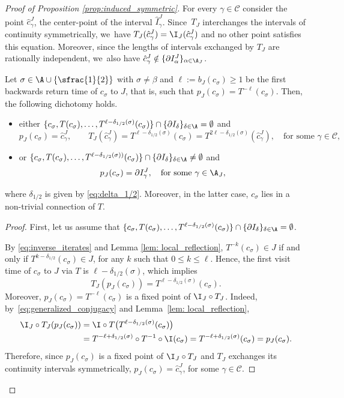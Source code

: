 \begin{proof}[Proof of Proposition \ref{prop:induced_symmetric}]
For every $\gamma\in\mathcal C$ consider the point $\hat c_\gamma^J$, the center-point of the interval $\hat I^J_{\gamma}$. Since~$T_J$ interchanges the intervals of continuity symmetrically, we~have $T_J(\hat c_\gamma^J)=\I_J(\hat c_\gamma^J)$ and no other point satisfies this equation. Moreover, since the lengths of intervals exchanged by $T_J$ are rationally independent, we~also have $\hat c_\gamma^J \notin\{\partial I^J_{\alpha}\}_{\alpha\in\A_J}$.

\begin{claim}
\label{cl:backward_centers}
Let $\sigma \in \A \cup \{\sfrac{1}{2}\}$ with $\sigma \neq \beta$ and $\ell := b_J(c_\sigma) \geq 1$ be the first backwards return time of $c_\sigma$ to $J$, that is, such that $p_J(c_\sigma) = T^{-\ell}(c_\sigma)$. Then, the following dichotomy holds.
\begin{itemize}
\item either $\{c_\sigma, T(c_\sigma), \ldots, T^{\ell - \delta_{1/2}(\sigma)}(c_\sigma)\} \cap \{\partial I_\delta\}_{\delta \in \A} = \emptyset$ and
\[
p_J(c_\sigma) = \hat c_\gamma^J,\qquad T_J(\hat c_\gamma^J) = T^{\ell - \delta_{1/2}(\sigma)}(c_\sigma) = T^{2\ell - \delta_{1/2}(\sigma)}(\hat c_\gamma^J), \quad \text{for some } \gamma \in \mathcal C,
\]
\item or $\{c_\sigma, T(c_\sigma), \ldots, T^{\ell - \delta_{1/2}(\sigma))}(c_\sigma)\} \cap \{\partial I_\delta\}_{\delta \in \A} \neq \emptyset$ and
\[
p_J(c_\sigma) = \partial I_\gamma^J,\quad\text{for some } \gamma \in \A_J,
\]
\end{itemize}
where $\delta_{1/2}$ is given by \eqref{eq:delta_1/2}. Moreover, in the latter case, $c_\sigma$ lies in a non-trivial connection of $T$.
\end{claim}

\begin{proof}
First, let us assume that $\{c_\sigma, T(c_\sigma), \ldots, T^{\ell - \delta_{1/2}(\sigma)}(c_\sigma)\} \cap \{\partial I_\delta\}_{\delta \in \A} = \emptyset$.

By \eqref{eq:inverse_iterates} and Lemma \ref{lem: local_reflection},
$T^{-k}(c_\sigma) \in J$ if and only if $T^{k - \delta_{1/2}}(c_\sigma) \in J$,
for any $k$ such that $0 \leq k \leq \ell$. Hence, the first visit time of $c_\sigma$ to $J$
via $T$ is $\ell - \delta_{1/2}(\sigma)$, which implies
\[
T_J(p_J(c_\sigma)) = T^{\ell - \delta_{1/2}(\sigma)}(c_\sigma).
\]
Moreover, $p_J(c_\sigma) = T^{-\ell}(c_\sigma)$ is a fixed point of $\I_J \circ T_J$. Indeed, by~\eqref{eq:generalized_conjugacy} and Lemma~\ref{lem: local_reflection},
\begin{align*}
\I_J \circ T_J(p_J(c_\sigma)) &= \I \circ T \big( T^{\ell -
\delta_{1/2}(\sigma)}(c_\sigma) \big) \\
&= T^{-\ell + \delta_{1/2}(\sigma)}\circ
T^{-1} \circ \I (c_\sigma) = T^{-\ell + \delta_{1/2}(\sigma)} (c_\sigma) =
p_J(c_\sigma).
\end{align*}
Therefore, since $p_J(c_\sigma)$ is a fixed point of $\I_J \circ T_J$ and $T_J$ exchanges its continuity intervals symmetrically, $p_J(c_\sigma) = \hat c_\gamma^J$, for some $\gamma \in \mathcal C$.


\end{proof}
\end{proof}
